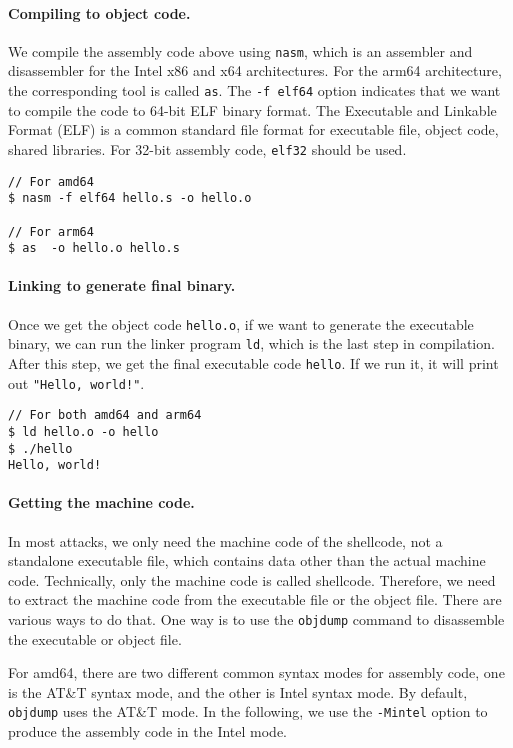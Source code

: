  

\paragraph{Compiling to object code.}
We compile the assembly code above using \texttt{nasm}, which 
is an assembler and disassembler for the Intel x86 and x64 architectures.
For the arm64 architecture, the corresponding tool is called \texttt{as}.  
The \texttt{-f elf64} option indicates that we want to compile the code
to 64-bit ELF binary format. The Executable and Linkable Format (ELF) 
is a common standard file format for executable file, object code, shared libraries. 
For 32-bit assembly code, \texttt{elf32} should be used. 

\begin{lstlisting}
// For amd64
$ nasm -f elf64 hello.s -o hello.o  

// For arm64
$ as  -o hello.o hello.s 
\end{lstlisting}

\paragraph{Linking to generate final binary.}
Once we get the object code \texttt{hello.o}, if we want to generate the 
executable binary, we can run the linker program \texttt{ld}, which
is the last step in compilation. 
After this step, we get the final
executable code \texttt{hello}.
If we run it, it will print out \texttt{"Hello, world!"}.  

\begin{lstlisting}
// For both amd64 and arm64
$ ld hello.o -o hello
$ ./hello  
Hello, world!
\end{lstlisting}



\paragraph{Getting the machine code.}
In most attacks, we only need the machine code 
of the shellcode, not a standalone executable file, which
contains data other than the actual machine code. 
Technically, only the machine code is called shellcode. 
Therefore, we need to extract the machine
code from the executable file or the object file.
There are various ways to do that. One way is to 
use the \texttt{objdump} command to disassemble the 
executable or object file. 

For amd64, there are two different common syntax modes for assembly code, 
one is the AT\&T syntax mode, and the other is 
Intel syntax mode. By default, \texttt{objdump} uses
the AT\&T mode. In the following, 
we use the \texttt{-Mintel} option to 
produce the assembly code in the Intel mode. 

